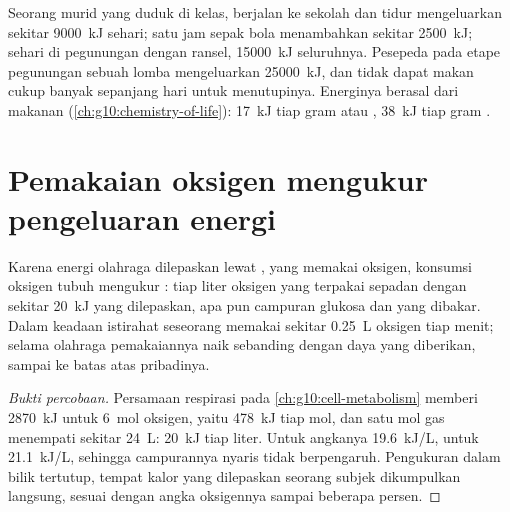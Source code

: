 \begin{example}\label{ex:g10:exercise-and-energy:budgets}
Seorang murid yang duduk di kelas, berjalan ke sekolah dan tidur
mengeluarkan sekitar \qty{9000}{kJ} sehari; satu jam sepak bola
menambahkan sekitar \qty{2500}{kJ}; sehari di pegunungan dengan ransel,
\qty{15000}{kJ} seluruhnya. Pesepeda pada etape pegunungan sebuah lomba
mengeluarkan \qty{25000}{kJ}, dan tidak dapat makan cukup banyak
sepanjang hari untuk menutupinya. Energinya berasal dari makanan
(\cref{ch:g10:chemistry-of-life}): \qty{17}{kJ} tiap gram 
atau , \qty{38}{kJ} tiap gram .
\end{example}

\section{Pemakaian oksigen mengukur pengeluaran energi}

\begin{proposition}\label{prop:g10:exercise-and-energy:oxygen}
Karena energi olahraga dilepaskan lewat , yang memakai
oksigen, konsumsi oksigen tubuh mengukur : tiap
liter oksigen yang terpakai sepadan dengan sekitar \qty{20}{kJ} yang
dilepaskan, apa pun campuran glukosa dan  yang dibakar. Dalam
keadaan istirahat seseorang memakai sekitar \qty{0.25}{L} oksigen tiap
menit; selama olahraga pemakaiannya naik sebanding dengan daya yang
diberikan, sampai ke batas atas pribadinya.
\end{proposition}
\begin{proof}[Bukti percobaan]
Persamaan respirasi pada \cref{ch:g10:cell-metabolism} memberi
\qty{2870}{kJ} untuk \qty{6}{mol} oksigen, yaitu \qty{478}{kJ} tiap mol,
dan satu mol gas menempati sekitar \qty{24}{L}: \qty{20}{kJ} tiap liter.
Untuk  angkanya \qty{19.6}{kJ/L}, untuk 
\qty{21.1}{kJ/L}, sehingga campurannya nyaris tidak berpengaruh.
Pengukuran dalam bilik tertutup, tempat kalor yang dilepaskan seorang
subjek dikumpulkan langsung, sesuai dengan angka oksigennya sampai
beberapa persen.
\end{proof}

